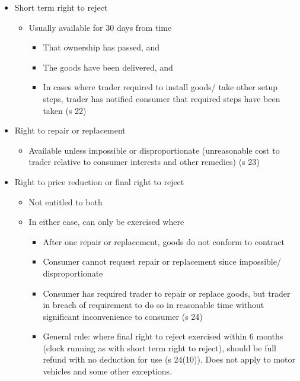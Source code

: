 \documentclass[
]{article}
\providecommand{\tightlist}{%
  \setlength{\itemsep}{0pt}\setlength{\parskip}{0pt}}
\begin{document}
\begin{itemize}
\tightlist
\item
  Short term right to reject

  \begin{itemize}
  \tightlist
  \item
    Usually available for 30 days from time

    \begin{itemize}
    \tightlist
    \item
      That ownership has passed, and
    \item
      The goods have been delivered, and
    \item
      In cases where trader required to install goods/ take other setup
      steps, trader has notified consumer that required steps have been
      taken (s 22)
    \end{itemize}
  \end{itemize}
\item
  Right to repair or replacement

  \begin{itemize}
  \tightlist
  \item
    Available unless impossible or disproportionate (unreasonable cost
    to trader relative to consumer interests and other remedies) (s 23)
  \end{itemize}
\item
  Right to price reduction or final right to reject

  \begin{itemize}
  \tightlist
  \item
    Not entitled to both
  \item
    In either case, can only be exercised where

    \begin{itemize}
    \tightlist
    \item
      After one repair or replacement, goods do not conform to contract
    \item
      Consumer cannot request repair or replacement since impossible/
      disproportionate
    \item
      Consumer has required trader to repair or replace goods, but
      trader in breach of requirement to do so in reasonable time
      without significant inconvenience to consumer (s 24)
    \item
      General rule: where final right to reject exercised within 6
      months (clock running as with short term right to reject), should
      be full refund with no deduction for use (s 24(10)). Does not
      apply to motor vehicles and some other exceptions.
    \end{itemize}
  \end{itemize}
\end{itemize}
\end{document}
